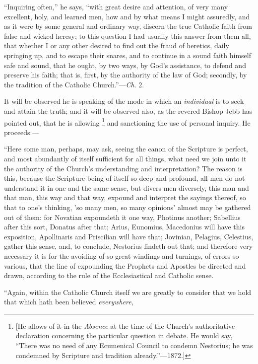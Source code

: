 ``Inquiring often,'' he says, ``with great desire and
attention, of very many excellent, holy, and learned men, how and by
what means I might assuredly, and as it were by some general and
ordinary way, discern the true Catholic
faith from false and wicked heresy; to this question I had usually
this answer from them all, that whether I or any other desired to find
out the fraud of heretics, daily springing up, and to escape their
snares, and to continue in a sound faith himself safe and sound, that
he ought, by two ways, by God's assistance, to defend and preserve
his faith; that is, first, by the authority of the law of God;
secondly, by the tradition of the Catholic Church.''—\emph{Ch}.
2.

It will be observed he is speaking of the mode in which an \emph{individual}
is to seek and attain the truth; and it will be observed also, as the
revered Bishop Jebb has pointed out, that he is allowing \footnote{[He allows of
it in the \emph{Absence} at the time of the Church's authoritative
declaration concerning the particular question in debate. He would
say, ``There was no need of any Ecumenical Council to condemn
Nestorius; he was condemned by Scripture and tradition already.''—1872.]} and sanctioning the use of personal inquiry. He proceeds:—

``Here some man, perhaps, may ask, seeing the canon of the
Scripture is perfect, and most abundantly of itself sufficient for all
things, what need we join unto it the authority of the Church's
understanding and interpretation? The reason is this, because the
Scripture being of itself so deep and profound, all men do not
understand it in one and the same sense, but divers men diversely,
this man and that man, this way and that way, expound and interpret
the sayings thereof, so that to one's thinking, 'so many men, so
many opinions' almost may be gathered out of them: for Novatian
expoundeth it one way, Photinus another; Sabellius after this sort,
Donatus after that; Arius, Eunomius, Macedonius will have this
exposition, Apollinaris and Priscilian will have that; Jovinian,
Pelagius, Celestius, gather this sense, and, to conclude, Nestorius
findeth out that; and therefore very necessary it is for the avoiding
of so great windings and turnings, of errors so various, that the line
of expounding the Prophets and Apostles be directed and drawn,
according to the rule of the Ecclesiastical and Catholic sense.

``Again, within the Catholic Church itself we are greatly to
consider that we hold that which hath been believed \emph{everywhere},

